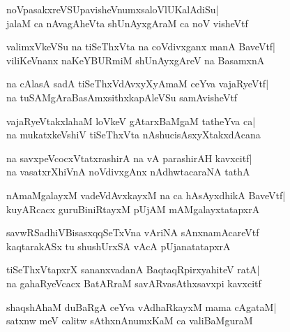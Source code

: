 \documentclass[twoside,12pt,openright]{book}
\newcounter{shloka}[chapter]
\begin{document}
\begin{shloka}%
noVpasakxreVSUpavisheVnumxsaloVlUKalAdiSu|\\
jalaM ca nAvagAheVta shUnAyxgAraM ca noV visheVtf
\end{shloka}

\begin{shloka}%
valimxVkeVSu na tiSeThxVta na coVdivxganx manA BaveVtf|\\
viliKeVnanx naKeYBURmiM shUnAyxgAreV na BasamxnA
\end{shloka}

\begin{shloka}%
na cAlasA sadA tiSeThxVdAvxyXyAmaM ceYva vajaRyeVtf|\\
na tuSAMgAraBasAmxsithxkapAleVSu samAvisheVtf
\end{shloka}

\begin{shloka}%
vajaRyeVtakxlahaM loVkeV gAtarxBaMgaM tatheYva ca|\\
na mukatxkeVshiV tiSeThxVta nAshucisAsxyXtakxdAcana
\end{shloka}

\begin{shloka}%
na savxpeVcocxVtatxrashirA na vA parashirAH kavxcitf|\\
na vasatxrXhiVnA noVdivxgAnx nAdhwtacaraNA tathA
\end{shloka}

\begin{shloka}%
nAmaMgalayxM vadeVdAvxkayxM na ca hAsAyxdhikA BaveVtf|\\
kuyARcacx guruBiniRtayxM pUjAM mAMgalayxtatapxrA
\end{shloka}

\begin{shloka}%
savwRSadhiVBisasxqqSeTxVna vAriNA sAnxnamAcareVtf\\
kaqtarakASx tu shushUrxSA vAcA pUjanatatapxrA
\end{shloka}

\begin{shloka}%
tiSeThxVtapxrX sananxvadanA BaqtaqRpirxyahiteV ratA|\\
na gahaRyeVcacx BatARraM savARvasAthxsavxpi kavxcitf
\end{shloka}

\begin{shloka}%
shaqshAhaM duBaRgA ceYva vAdhaRkayxM mama cAgataM|\\
satxnw meV calitw sAthxnAnumxKaM ca valiBaMguraM
\end{shloka}
\end{document}
